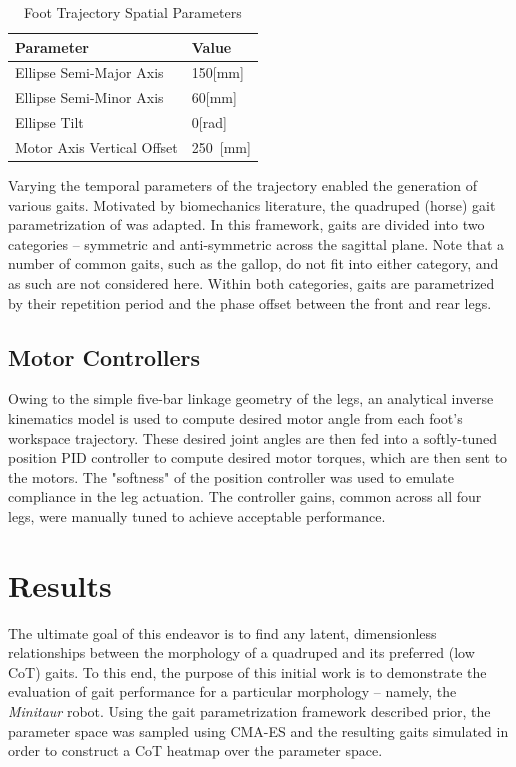 \documentclass[conference,11pt,letterpaper]{IEEEtran}
\begin{document}
\begin{table}[ht!]
	\centering
	\caption{Foot Trajectory Spatial Parameters}
	\label{table:traj-params}
	\begin{tabular}{@{}ll@{}}
		\toprule
		Parameter                  & Value \\ \midrule
		Ellipse Semi-Major Axis    & 150\hfill[\si{\mm}]   \\
		Ellipse Semi-Minor Axis    & 60\hfill[\si{\mm}]  \\
		Ellipse Tilt               & 0\hfill[\si{\radian}]   \\
		Motor Axis Vertical Offset & 250~\hfill[\si{\mm}]  \\ \bottomrule
	\end{tabular}
\end{table}

Varying the temporal parameters of the trajectory enabled the generation of various gaits. Motivated by biomechanics literature, the quadruped (horse) gait parametrization of \autocite{Hildebrand701} was adapted. In this framework, gaits are divided into two categories -- symmetric and anti-symmetric across the sagittal plane. Note that a number of common gaits, such as the gallop, do not fit into either category, and as such are not considered here. Within both categories, gaits are parametrized by their repetition period and the phase offset between the front and rear legs.

\subsection{Motor Controllers}
Owing to the simple five-bar linkage geometry of the legs, an analytical inverse kinematics model is used to compute desired motor angle from each foot's workspace trajectory. These desired joint angles are then fed into a softly-tuned position PID controller to compute desired motor torques, which are then sent to the motors. The "softness" of the position controller was used to emulate compliance in the leg actuation. The controller gains, common across all four legs, were manually tuned to achieve acceptable performance. 

\section{Results}

The ultimate goal of this endeavor is to find any latent, dimensionless relationships between the morphology of a quadruped and its preferred (low CoT) gaits. To this end, the purpose of this initial work is to demonstrate the evaluation of gait performance for a particular morphology -- namely, the \emph{Minitaur} robot. Using the gait parametrization framework described prior, the parameter space was sampled using CMA-ES and the resulting gaits simulated in order to construct a CoT heatmap over the parameter space.
\end{document}
